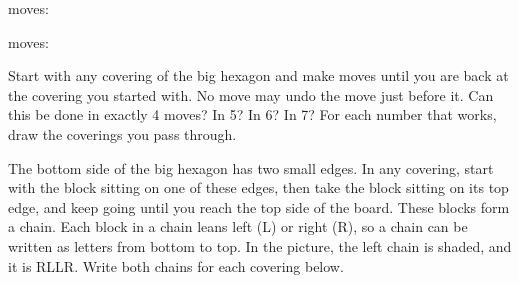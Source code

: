 \documentclass[12pt]{article}
\begin{document}
\vspace{0.5in}
\hspace{10pt}\hspace{0.2in}\raisebox{0.7in}{\rarrow}\hspace{0.2in}\hspace{0.5in}moves: \blank

\vspace{0.4in}
\hspace{10pt}\hspace{0.2in}\raisebox{0.7in}{\rarrow}\hspace{0.2in}\hspace{0.5in}moves: \blank

\newpage

 Start with any covering of the big hexagon and make moves until you are back at the covering you started with. No move may undo the move just before it. Can this be done in exactly 4 moves? In 5? In 6? In 7? For each number that works, draw the coverings you pass through.

\vspace{0.35in}
\centering
{}\hspace{0.25in}\hspace{0.25in}\hspace{0.25in}

\vspace{0.25in}
\hspace{0.25in}\hspace{0.25in}\hspace{0.25in}

\vspace{0.25in}
\hspace{0.25in}\hspace{0.25in}\hspace{0.25in}

\raggedright
\newpage

 The bottom side of the big hexagon has two small edges. In any covering, start with the block sitting on one of these edges, then take the block sitting on its top edge, and keep going until you reach the top side of the board. These blocks form a chain. Each block in a chain leans left (L) or right (R), so a chain can be written as letters from bottom to top. In the picture, the left chain is shaded, and it is RLLR. Write both chains for each covering below.
\end{document}

